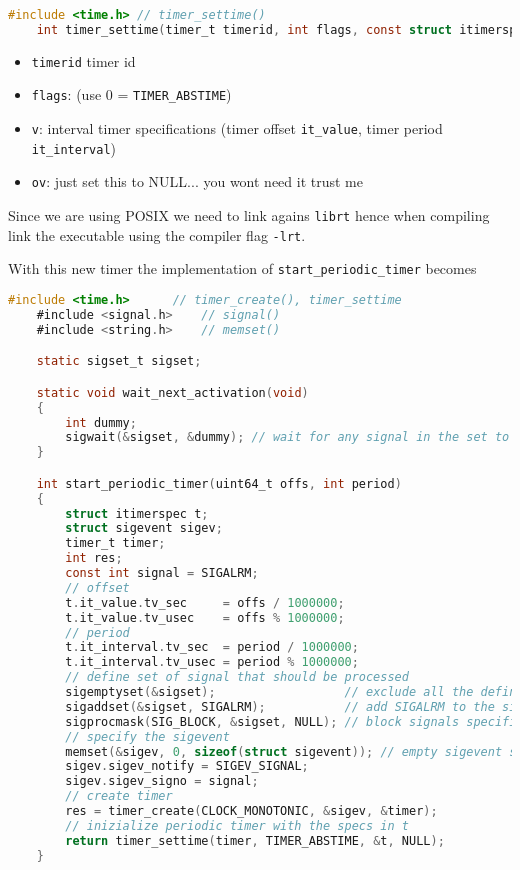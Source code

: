 \begin{lstlisting}[language=C]
    #include <time.h> // timer_settime()
    int timer_settime(timer_t timerid, int flags, const struct itimerspec*v, struct itimerspec *ov);
\end{lstlisting}
\begin{itemize}
    \item \texttt{timerid} timer id
    \item \texttt{flags}: (use 0 = \texttt{TIMER\_ABSTIME})
    \item \texttt{v}: interval timer specifications (timer offset \texttt{it\_value}, timer period \texttt{it\_interval})
    \item \texttt{ov}: just set this to NULL... you wont need it trust me
\end{itemize}

Since we are using POSIX we need to link agains \texttt{librt} hence when compiling link the executable using the compiler flag \texttt{-lrt}.

With this new timer the implementation of \texttt{start\_periodic\_timer} becomes
\begin{lstlisting}[language=C]
    #include <time.h>      // timer_create(), timer_settime
    #include <signal.h>    // signal()
    #include <string.h>    // memset()

    static sigset_t sigset;

    static void wait_next_activation(void)
    {
        int dummy;
        sigwait(&sigset, &dummy); // wait for any signal in the set to be pending
    }

    int start_periodic_timer(uint64_t offs, int period)
    {
        struct itimerspec t;
        struct sigevent sigev;
        timer_t timer;
        int res;
        const int signal = SIGALRM;
        // offset
        t.it_value.tv_sec     = offs / 1000000;
        t.it_value.tv_usec    = offs % 1000000;
        // period
        t.it_interval.tv_sec  = period / 1000000;
        t.it_interval.tv_usec = period % 1000000;
        // define set of signal that should be processed
        sigemptyset(&sigset);                  // exclude all the defined signals
        sigaddset(&sigset, SIGALRM);           // add SIGALRM to the signal set
        sigprocmask(SIG_BLOCK, &sigset, NULL); // block signals specified in sigset (required by sigwait)
        // specify the sigevent
        memset(&sigev, 0, sizeof(struct sigevent)); // empty sigevent structure
        sigev.sigev_notify = SIGEV_SIGNAL;
        sigev.sigev_signo = signal;
        // create timer
        res = timer_create(CLOCK_MONOTONIC, &sigev, &timer);
        // inizialize periodic timer with the specs in t
        return timer_settime(timer, TIMER_ABSTIME, &t, NULL);
    }
\end{lstlisting}


